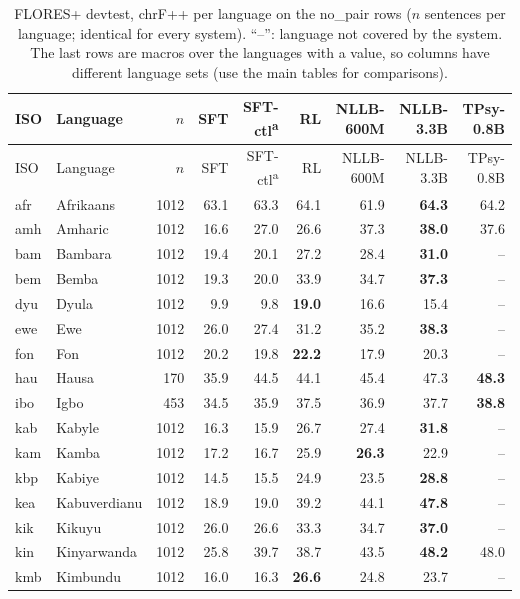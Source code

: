 {\footnotesize\setlength{\tabcolsep}{3pt}
\begin{longtable}{@{}llrrrrrrr@{}}
\caption{FLORES+ devtest, chrF++ per language on the no\_pair rows ($n$ sentences per language; identical for every system). ``--'': language not covered by the system. The last rows are macros over the languages with a value, so columns have different language sets (use the main tables for comparisons).}\label{tab:full-flores-chrfpp}\\
\toprule
ISO & Language & $n$ & SFT & SFT-ctl\textsuperscript{a} & RL & NLLB-600M & NLLB-3.3B & TPsy-0.8B \\
\midrule\endfirsthead
\toprule
ISO & Language & $n$ & SFT & SFT-ctl\textsuperscript{a} & RL & NLLB-600M & NLLB-3.3B & TPsy-0.8B \\
\midrule\endhead
\midrule\endfoot
\bottomrule\endlastfoot
afr & Afrikaans & 1012 & 63.1 & 63.3 & 64.1 & 61.9 & \textbf{64.3} & 64.2 \\
amh & Amharic & 1012 & 16.6 & 27.0 & 26.6 & 37.3 & \textbf{38.0} & 37.6 \\
bam & Bambara & 1012 & 19.4 & 20.1 & 27.2 & 28.4 & \textbf{31.0} & -- \\
bem & Bemba & 1012 & 19.3 & 20.0 & 33.9 & 34.7 & \textbf{37.3} & -- \\
dyu & Dyula & 1012 & 9.9 & 9.8 & \textbf{19.0} & 16.6 & 15.4 & -- \\
ewe & Ewe & 1012 & 26.0 & 27.4 & 31.2 & 35.2 & \textbf{38.3} & -- \\
fon & Fon & 1012 & 20.2 & 19.8 & \textbf{22.2} & 17.9 & 20.3 & -- \\
hau & Hausa & 170 & 35.9 & 44.5 & 44.1 & 45.4 & 47.3 & \textbf{48.3} \\
ibo & Igbo & 453 & 34.5 & 35.9 & 37.5 & 36.9 & 37.7 & \textbf{38.8} \\
kab & Kabyle & 1012 & 16.3 & 15.9 & 26.7 & 27.4 & \textbf{31.8} & -- \\
kam & Kamba & 1012 & 17.2 & 16.7 & 25.9 & \textbf{26.3} & 22.9 & -- \\
kbp & Kabiye & 1012 & 14.5 & 15.5 & 24.9 & 23.5 & \textbf{28.8} & -- \\
kea & Kabuverdianu & 1012 & 18.9 & 19.0 & 39.2 & 44.1 & \textbf{47.8} & -- \\
kik & Kikuyu & 1012 & 26.0 & 26.6 & 33.3 & 34.7 & \textbf{37.0} & -- \\
kin & Kinyarwanda & 1012 & 25.8 & 39.7 & 38.7 & 43.5 & \textbf{48.2} & 48.0 \\
kmb & Kimbundu & 1012 & 16.0 & 16.3 & \textbf{26.6} & 24.8 & 23.7 & -- \\

\end{longtable}}
